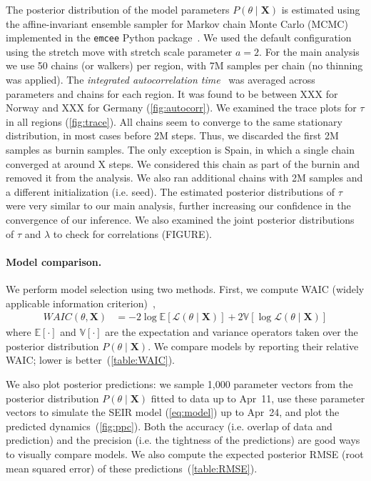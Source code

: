 \documentclass[12pt]{extarticle}
\let\vec\mathbf
\begin{document}
{The posterior distribution of the model parameters $P(\theta \mid \vec{X})$ is estimated using the affine-invariant ensemble sampler for Markov chain Monte Carlo (MCMC)~\citep{Goodman2010} implemented in the \texttt{emcee} Python package~\citep{Foreman-Mackey2013}. We used the default configuration using the stretch move with stretch scale parameter $a=2$.
For the main analysis we use 50 chains (or walkers) per region, with 7M samples per chain (no thinning was applied).
The \emph{integrated autocorrelation time}~\citep{Foreman-Mackey2013,Goodman2010} was averaged across parameters and chains for each region. 
It was found to be between XXX for Norway and XXX for Germany (\autoref{fig:autocorr}). %
We examined the trace plots for $\tau$ in all regions (\autoref{fig:trace}).
All chains seem to converge to the same stationary distribution, in most cases before 2M steps. Thus, we discarded the first 2M samples as burnin samples.
The only exception is Spain, in which a single chain converged at around X steps.
We considered this chain as part of the burnin and removed it from the analysis.
We also ran additional chains with 2M samples and a different initialization (i.e. seed). The estimated posterior distributions of $\tau$ were very similar to our main analysis, further increasing our confidence in the convergence of our inference.
We also examined the joint posterior distributions of $\tau$ and $\lambda$ to check for correlations (FIGURE). %

\paragraph*{Model comparison.}
We perform model selection using two methods.
First, we compute WAIC (widely applicable information criterion)~\citep{gelman2013bayesian},
\begin{equation} \label{eq:WAIC}
\begin{aligned}
\mathit{WAIC}(\theta, \vec{X}) &= -2\log\mathbb{E}[\mathcal{L}(\theta \mid \vec{X})] + 2\mathbb{V}[\log\mathcal{L}(\theta \mid \vec{X})]
\end{aligned}
\end{equation}
where $\mathbb{E}[\cdot]$ and $\mathbb{V}[\cdot]$ are the expectation and variance operators taken over the posterior distribution $P(\theta \mid \vec{X})$.
We compare models by reporting their relative WAIC; lower is better~(\autoref{table:WAIC}).

We also plot posterior predictions: we sample 1,000 parameter vectors from the posterior distribution $P(\theta \mid \vec{X})$ fitted to data up to Apr~11, use these parameter vectors to simulate the SEIR model (\autoref{eq:model}) up to Apr~24, and plot the predicted dynamics~(\autoref{fig:ppc}).
Both the accuracy (i.e. overlap of data and prediction) and the precision (i.e. the tightness of the predictions) are good ways to visually compare models.
We also compute the expected posterior RMSE (root mean squared error) of these predictions~(\autoref{table:RMSE}).
} %
\end{document}
